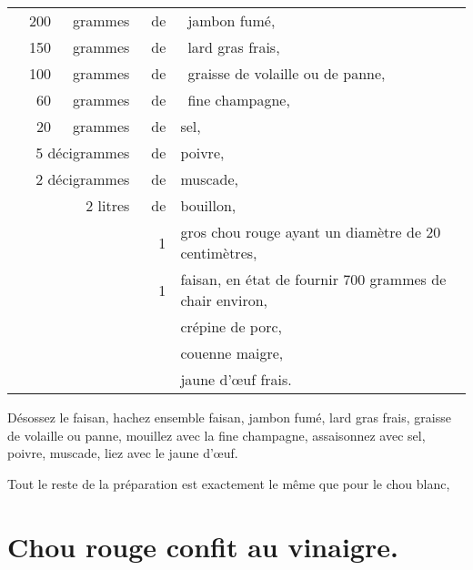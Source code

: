 \footnotesize
\begin{longtable}{rrrrp{16em}}
  &     200 & grammes  & de & jambon fumé,                                                                \\
  &     150 & grammes  & de & lard gras frais,                                                            \\
  &     100 & grammes  & de & graisse de volaille ou de panne,                                            \\
  &      60 & grammes  & de & fine champagne,                                                             \\
  &      20 & grammes  & de & sel,                                                                        \\
  & \multicolumn{2}{r}{5 décigrammes}& de & poivre,                                                       \\
  & \multicolumn{2}{r}{2 décigrammes}& de & muscade,                                                      \\
  &         & 2 litres & de & bouillon,                                                                   \\
  &         &          &  1 & gros chou rouge ayant un diamètre de 20 centimètres,                        \\
  &         &          &  1 & faisan, en état de fournir 700 grammes de chair environ,                    \\
  &         &          &    & crépine de porc,                                                            \\
  &         &          &    & couenne maigre,                                                             \\
  &         &          &    & jaune d'œuf frais.                                                          \\
\end{longtable}
\normalsize

Désossez le faisan, hachez ensemble faisan, jambon fumé, lard gras frais,
graisse de volaille ou panne, mouillez avec la fine champagne, assaisonnez avec
sel, poivre, muscade, liez avec le jaune d'œuf.

Tout le reste de la préparation est exactement le même que pour le chou blanc,

\section*{\centering Chou rouge confit au vinaigre.}
{}


